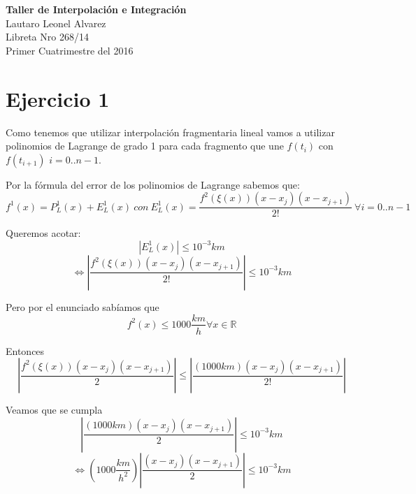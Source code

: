 \documentclass[a4paper,10pt]{article}
\begin{document}
\begin{addmargin}[8cm]{0cm}
	\textbf{Taller de Interpolación e Integración} \\
	Lautaro Leonel Alvarez \\
	Libreta Nro 268/14 \\
	Primer Cuatrimestre del 2016 \\
\end{addmargin}



\section{Ejercicio 1}
\par Como tenemos que utilizar interpolación fragmentaria lineal vamos a utilizar polinomios de Lagrange de grado 1 para cada fragmento que une $f(t_i)$ con $f(t_{i+1})$ \forall $i=0..n-1$. \\
\par Por la fórmula del error de los polinomios de Lagrange sabemos que: \\
\begin{equation}
	f^1(x) = P_L^1(x) + E_L^1(x)\ con\ E_L^1(x) = \frac{f^2(\xi(x))(x - x_j)(x - x_{j+1})}{2!}\ \forall i=0..n-1
\end{equation}
\par Queremos acotar:
\begin{equation}
	| E_L^1(x) | \leq 10^{-3} km
\end{equation}
\begin{equation}
	\Leftrightarrow | \frac{f^2(\xi(x))(x - x_j)(x - x_{j+1})}{2!} | \leq 10^{-3} km
\end{equation}
\par Pero por el enunciado sabíamos que
\begin{equation}
	f^2(x) \leq 1000 \frac{km}{h} \forall x \in \mathds{R}
\end{equation}
\par Entonces
\begin{equation}
	| \frac{f^2(\xi(x))(x - x_j)(x - x_{j+1})}{2} | \leq | \frac{(1000 km)(x - x_j)(x - x_{j+1})}{2!} |
\end{equation}
\par Veamos que se cumpla
\begin{equation}
	| \frac{(1000 km)(x - x_j)(x - x_{j+1})}{2} | \leq 10^{-3} km
\end{equation}
\begin{equation}
	\Leftrightarrow (1000 \frac{km}{h^2}) | \frac{(x - x_j)(x - x_{j+1})}{2} | \leq 10^{-3} km
\end{equation}
\end{document}
